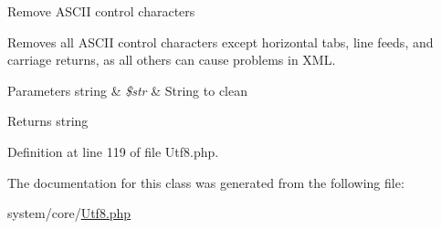 Remove A\+S\+C\+II control characters

Removes all A\+S\+C\+II control characters except horizontal tabs, line feeds, and carriage returns, as all others can cause problems in X\+ML.


\begin{DoxyParams}[1]{Parameters}
string & {\em \$str} & String to clean \\
\hline
\end{DoxyParams}
\begin{DoxyReturn}{Returns}
string 
\end{DoxyReturn}


Definition at line 119 of file Utf8.\+php.



The documentation for this class was generated from the following file\+:\begin{DoxyCompactItemize}
\item 
system/core/\mbox{\hyperlink{_utf8_8php}{Utf8.\+php}}\end{DoxyCompactItemize}
